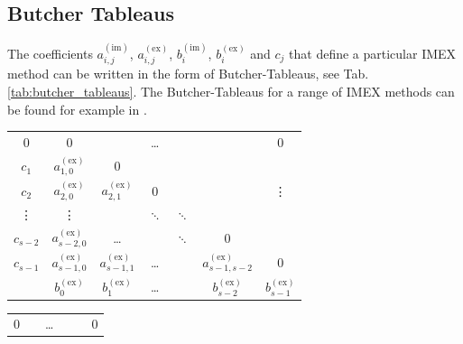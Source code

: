 \documentclass[11pt]{article}
\newcommand{\impl}{{(\text{im})}}
\newcommand{\expl}{{(\text{ex})}}
\begin{document}
\subsection{Butcher Tableaus}\label{sec:butcher_tableaus}
The coefficients $a_{i,j}^\impl$, $a_{i,j}^\expl$, $b_{i}^\impl$, $b_{i}^\expl$ and $c_j$ that define a particular IMEX method can be written in the form of Butcher-Tableaus, see Tab. \ref{tab:butcher_tableaus}. The Butcher-Tableaus for a range of IMEX methods can be found for example in \cite{Weller2013}.
\begin{table}
    \begin{minipage}{0.45\linewidth}
        \begin{center}
            \begin{tabular}{c|cccccc}
                0         & 0                 &                   & \dots    &          &                     & 0               \\
                $c_1$     & $a_{1,0}^\expl$   & 0                                                                               \\
                $c_2$     & $a_{2,0}^\expl$   & $a_{2,1}^\expl$   & 0        &          &                     & \vdots          \\
                \vdots    & \vdots            &                   & $\ddots$ & $\ddots$                                         \\
                $c_{s-2}$ & $a_{s-2,0}^\expl$ & \dots             &          & $\ddots$ & 0                                     \\
                $c_{s-1}$ & $a_{s-1,0}^\expl$ & $a_{s-1,1}^\expl$ & \dots    &          & $a_{s-1,s-2}^\expl$ & 0               \\
                \hline
                          & $b_0^\expl$       & $b_1^\expl$       & \dots    &          & $b_{s-2}^\expl$     & $b_{s-1}^\expl$ \\
            \end{tabular}
        \end{center}
    \end{minipage}
    \hfill
    \begin{minipage}{0.45\linewidth}
        \begin{center}
            \begin{tabular}{|cccccc}
                0      &                   & \dots           &          &                     & 0                   \\

\end{tabular}
\end{center}
\end{minipage}
\end{table}
\end{document}
